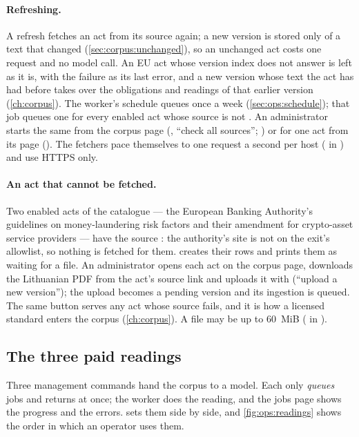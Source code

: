 \paragraph{Refreshing.} A refresh fetches an act from its source again; a new version is
stored only of a text that changed (\cref{sec:corpus:unchanged}), so an unchanged act costs
one request and no model call. An EU act whose version index does not answer is left as it
is, with the failure as its last error, and a new version whose text the act has had before
takes over the obligations and readings of that earlier version (\cref{ch:corpus}). The worker's schedule queues  once a week
(\cref{sec:ops:schedule}); that job queues one  for every enabled act
whose source is not . An administrator starts the same from the corpus page
(, \enquote{check all sources};
) or for one act from its page
(). The fetchers pace themselves to one
request a second per host ( in ) and use HTTPS
only.

\paragraph{An act that cannot be fetched.} Two enabled acts of the catalogue --- the European
Banking Authority's guidelines on money-laundering risk factors and their amendment for
crypto-asset service providers --- have the source : the authority's site is not
on the exit's allowlist, so nothing is fetched for them.  creates their rows
and prints them as waiting for a file. An administrator opens each act on the corpus page,
downloads the Lithuanian PDF from the act's source link and uploads it with  (\enquote{upload a new version}); the upload becomes a pending version and its
ingestion is queued. The same button serves any act whose source fails, and it is how a
licensed standard enters the corpus (\cref{ch:corpus}). A file may be up to 60~MiB
( in ).

\subsection{The three paid readings}\label{sec:ops:readings}

Three management commands hand the corpus to a model. Each only \emph{queues} jobs and
returns at once; the worker does the reading, and the jobs page shows the progress and the
errors.  sets them side by side, and \cref{fig:ops:readings} shows the
order in which an operator uses them.

